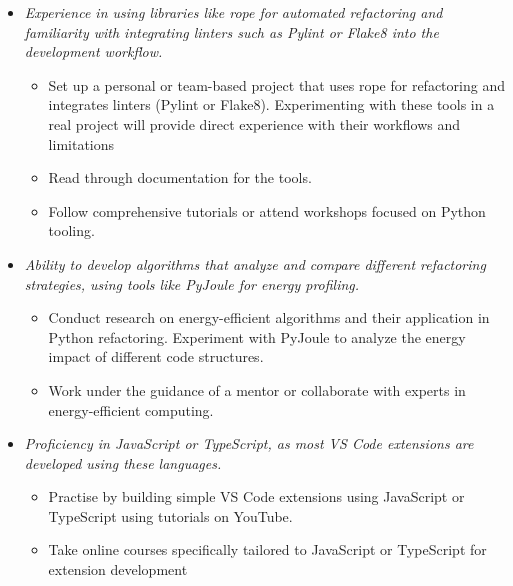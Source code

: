 \documentclass[12pt]{article}
\begin{document}
\begin{enumerate}[wide=0pt, leftmargin=*]
\begin{itemize}
      \item \textit{Experience in using libraries like rope for
          automated refactoring and familiarity with integrating
        linters such as Pylint or Flake8 into the development workflow.}
        \begin{itemize}
          \item Set up a personal or team-based project that uses
            rope for refactoring and integrates linters (Pylint or
            Flake8). Experimenting with these tools in a real project
            will provide direct experience with their workflows and limitations
          \item Read through documentation for the tools.
          \item Follow comprehensive tutorials or attend workshops
            focused on Python tooling.
        \end{itemize}

      \item \textit{Ability to develop algorithms that analyze and
          compare different refactoring strategies, using tools like
        PyJoule for energy profiling.}
        \begin{itemize}
          \item Conduct research on energy-efficient algorithms and
            their application in Python refactoring. Experiment with
            PyJoule to analyze the energy impact of different code structures.
          \item Work under the guidance of a mentor or collaborate
            with experts in energy-efficient computing.
        \end{itemize}

      \item \textit{Proficiency in JavaScript or TypeScript, as most
        VS Code extensions are developed using these languages.}
        \begin{itemize}
          \item Practise by building simple VS Code extensions using
            JavaScript or TypeScript using tutorials on YouTube.
          \item Take online courses specifically tailored to
            JavaScript or TypeScript for extension development
        \end{itemize}

    \end{itemize}

\end{enumerate}
\end{document}
